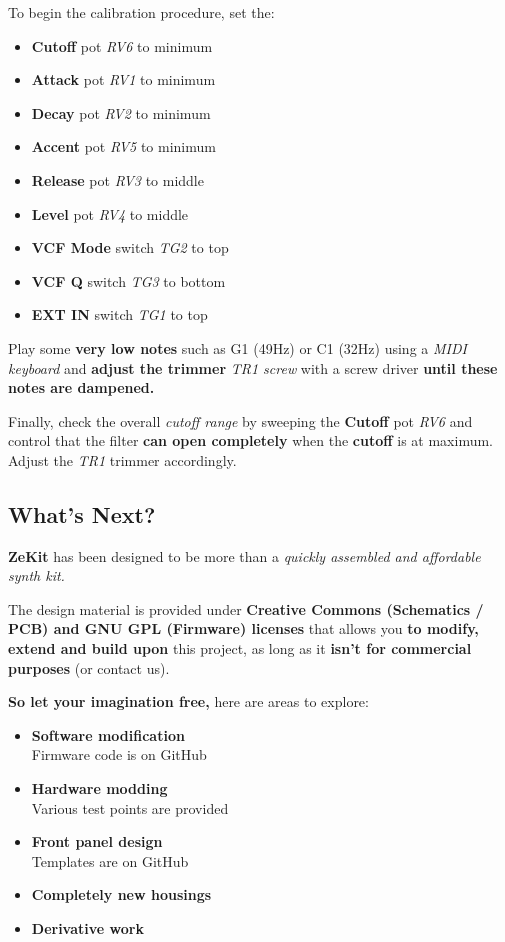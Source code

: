 \documentclass{scrartcl}
\begin{document}
To begin the calibration procedure, set the:
\begin{itemize}
    \item \textbf{Cutoff} pot \emph{RV6} to minimum
    \item \textbf{Attack} pot \emph{RV1} to minimum
    \item \textbf{Decay} pot \emph{RV2} to minimum
    \item \textbf{Accent} pot \emph{RV5} to minimum
    \item \textbf{Release} pot \emph{RV3} to middle
    \item \textbf{Level} pot \emph{RV4} to middle
    \item \textbf{VCF Mode} switch \emph{TG2} to top
    \item \textbf{VCF Q} switch \emph{TG3} to bottom
    \item \textbf{EXT IN} switch \emph{TG1} to top
\end{itemize}

\vspace{0.25cm}
Play some \textbf{very low notes} such as G1 (49Hz) or C1 (32Hz) using a \emph{MIDI keyboard} and \textbf{adjust the trimmer} \emph{TR1 screw} with a screw driver \textbf{until these notes are dampened.} 

Finally, check the overall \emph{cutoff range} by sweeping the \textbf{Cutoff} pot \emph{RV6} and control that the filter \textbf{can open completely} when the \textbf{cutoff} is at maximum. Adjust the \emph{TR1} trimmer accordingly. 

\pagebreak
\subsection{What's Next?}

\textbf{ZeKit} has been designed to be more than a \emph{quickly assembled and affordable synth kit.}

The design material is provided under \textbf{Creative Commons (Schematics / PCB) and GNU GPL (Firmware) licenses} that allows you \textbf{to modify, extend and build upon} this project,
as long as it \textbf{isn't for commercial purposes} (or contact us).

\textbf{So let your imagination free,} here are areas to explore:

\begin{itemize}
    \item \textbf{Software modification} \\
    Firmware code is on GitHub
    \item \textbf{Hardware modding} \\
    Various test points are provided
    \item \textbf{Front panel design} \\
    Templates are on GitHub
    \item \textbf{Completely new housings}
    \item \textbf{Derivative work}
\end{itemize}
\end{document}

